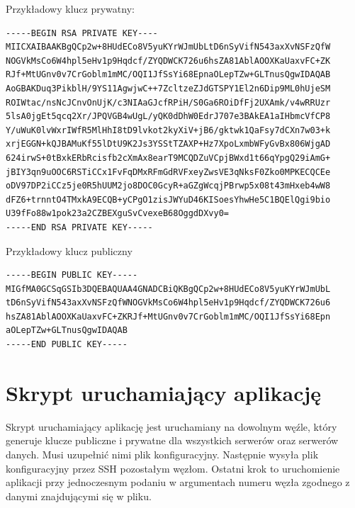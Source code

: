 Przykładowy klucz prywatny:
\begin{lstlisting}[style=incode]
-----BEGIN RSA PRIVATE KEY----
MIICXAIBAAKBgQCp2w+8HUdECo8V5yuKYrWJmUbLtD6nSyVifN543axXvNSFzQfW
NOGVkMsCo6W4hpl5eHv1p9Hqdcf/ZYQDWCK726u6hsZA81AblAOOXKaUaxvFC+ZK
RJf+MtUGnv0v7CrGoblm1mMC/OQI1JfSsYi68EpnaOLepTZw+GLTnusQgwIDAQAB
AoGBAKDuq3PikblH/9YS11AgwjwC++7ZcltzeZJdGTSPY1El2n6Dip9ML0hUjeSM
ROIWtac/nsNcJCnvOnUjK/c3NIAaGJcfRPiH/S0Ga6ROiDfFj2UXAmk/v4wRRUzr
5lsA0jgEt5qcq2Xr/JPQVGB4wUgL/yQK0dDhW0EdrJ707e3BAkEA1aIHbmcVfCP8
Y/uWuK0lvWxrIWfR5MlHhI8tD9lvkot2kyXiV+jB6/gktwk1QaFsy7dCXn7w03+k
xrjEGGN+kQJBAMuKf55lDtU9K2Js3YSStTZAXP+Hz7XpoLxmbWFyGvBx806WjgAD
624irwS+0tBxkERbRcisfb2cXmAx8earT9MCQDZuVCpjBWxd1t66qYpgQ29iAmG+
jBIY3qn9uOOC6RSTiCCx1FvFqDMxRFmGdRVFxeyZwsVE3qNksF0Zko0MPKECQCEe
oDV97DP2iCCz5je0R5hUUM2jo8DOC0GcyR+aGZgWcqjPBrwp5x08t43mHxeb4wW8
dFZ6+trnntO4TMxkA9ECQB+yCPgO1zisJWYuD46KISoesYhwHe5C1BQElQgi9bio
U39fFo88w1pok23a2CZBEXguSvCvexeB68OggdDXvy0=
-----END RSA PRIVATE KEY-----
\end{lstlisting}

Przykładowy klucz publiczny
\begin{lstlisting}[style=incode]
-----BEGIN PUBLIC KEY----- 
MIGfMA0GCSqGSIb3DQEBAQUAA4GNADCBiQKBgQCp2w+8HUdECo8V5yuKYrWJmUbL
tD6nSyVifN543axXvNSFzQfWNOGVkMsCo6W4hpl5eHv1p9Hqdcf/ZYQDWCK726u6
hsZA81AblAOOXKaUaxvFC+ZKRJf+MtUGnv0v7CrGoblm1mMC/OQI1JfSsYi68Epn
aOLepTZw+GLTnusQgwIDAQAB
-----END PUBLIC KEY-----
\end{lstlisting}


\section{Skrypt uruchamiający aplikację}
Skrypt uruchamiający aplikację jest uruchamiany na dowolnym węźle, który generuje klucze publiczne i prywatne dla wszystkich serwerów oraz serwerów danych. Musi uzupełnić nimi plik konfiguracyjny. Następnie wysyła plik konfiguracyjny przez SSH pozostałym węzłom. Ostatni krok to uruchomienie aplikacji przy jednoczesnym podaniu w argumentach numeru węzła zgodnego z danymi znajdującymi się w pliku.